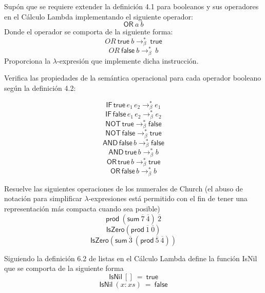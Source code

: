                 \begin{exercise}
                    Supón que se requiere extender la definición 4.1 para booleanos y sus operadores en el Cálculo Lambda implementando el siguiente operador:
                    \[\textsf{OR}\ a\ b\]
		Donde el operador se comporta de la siguiente forma:
		\[OR\ \textsf{true}\ b \to_\beta^*\ \textsf{true} \]
		\[OR\ \textsf{false}\ b \to_\beta^*\ b \]
		Proporciona la $\lambda$-expresión que implemente dicha instrucción.
                \end{exercise}

		\bigskip


                \begin{exercise}
                    Verifica las propiedades de la semántica operacional para cada operador booleano según la definición 4.2:

                        $$\mathsf{IF}\,\textsf{true}\,e_1\,e_2 \to_\beta^* e_1$$ 
                        $$\mathsf{IF}\,\textsf{false}\,e_1\,e_2 \to_\beta^* e_2$$ 
                        $$\mathsf{NOT}\,\textsf{true}\to_\beta^* \textsf{false}$$
                        $$\mathsf{NOT}\,\textsf{false}\to_\beta^* \textsf{true}$$
                        $$\mathsf{AND}\,\textsf{false}\,b\to_\beta^* \textsf{false}$$
                        $$\mathsf{AND}\,\textsf{true}\,b\to_\beta^* b$$
                        $$\mathsf{OR}\,\textsf{true}\,b\to_\beta^* \textsf{true}$$
                        $$\mathsf{OR}\,\textsf{false}\,b\to_\beta^* b$$
                        
                \end{exercise}


                \begin{exercise}
                    Resuelve las siguientes operaciones de los numerales de Church (el abuso de notación para simplificar $\lambda$-expresiones está permitido con el fin de tener una representación más compacta cuando sea posible)
                    \[
                            \textsf{prod}\ (\textsf{sum}\ \overline{7}\ \overline{4})\ \overline{2}
                    \]
                    \[
                            \textsf{IsZero} (\textsf{prod}\ \overline{1}\ \overline{0})
                    \]
                    \[
                            \textsf{IsZero}( \textsf{sum}\ \overline{3}\ (\textsf{prod}\ \overline{5}\ \overline{4}))
                    \]
                \end{exercise}  


                \begin{exercise}
                    Siguiendo la definición 6.2 de listas en el Cálculo Lambda define la función \textsf{IsNil} que se comporta de la siguiente forma
                    \[ \textsf{IsNil}\ []\ =\ \textsf{true} \]
                    \[ \textsf{IsNil}\ (x:xs)\  =\ \textsf{false}\]
                \end{exercise}


